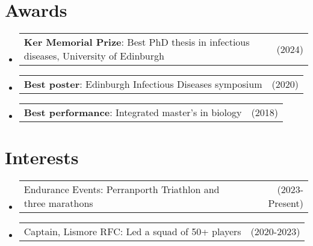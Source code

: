 \documentclass[a4paper,11pt]{article}
\begin{document}
\section{Awards}
\begin{itemize}[leftmargin=1.2em, itemsep=3pt, label=-]
\item \begin{tabularx}{\linewidth}{@{}X r@{}}
\textbf{Ker Memorial Prize}: Best PhD thesis in infectious diseases, University of Edinburgh & (2024) \\
\end{tabularx}
\item \begin{tabularx}{\linewidth}{@{}X r@{}}
\textbf{Best poster}: Edinburgh Infectious Diseases symposium & (2020) \\
\end{tabularx}
\item \begin{tabularx}{\linewidth}{@{}X r@{}}
\textbf{Best performance}: Integrated master's in biology & (2018) \\
\end{tabularx}
\end{itemize}

\section{Interests}
\begin{itemize}[leftmargin=1.2em, itemsep=3pt, label=-]
\item \begin{tabularx}{\linewidth}{@{}X r@{}}
Endurance Events: Perranporth Triathlon and three marathons & (2023-Present) \\
\end{tabularx}
\item \begin{tabularx}{\linewidth}{@{}X r@{}}
Captain, Lismore RFC: Led a squad of 50+ players & (2020-2023) \\
\end{tabularx}
\end{itemize}
\end{document}
